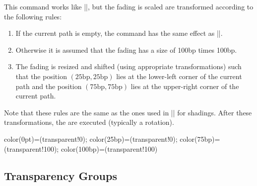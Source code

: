 \begin{command}{\pgfsetfadingforcurrentpath{}}
  This command works like |\pgfsetfading|, but the fading is scaled
  are transformed according to the following rules:
  \begin{enumerate}
  \item
    If the current path is empty, the command has the same effect as
    |\pgfsetfading|.
  \item
    Otherwise it is assumed that the fading has a size of 100bp times
    100bp.
  \item
    The fading is resized and shifted (using appropriate
    transformations) such that the position
    $(25\mathrm{bp},25\mathrm{bp})$ lies at the lower-left corner of
    the current path and the position $(75\mathrm{bp},75\mathrm{bp})$
    lies at the upper-right corner of the current path.
  \end{enumerate}
  Note that these rules are the same as the ones used in
  |\pgfshadepath| for shadings. After these transformations, the
   are executed (typically a rotation).
\begin{codeexample}[]
{ color(0pt)=(transparent!0);    color(25bp)=(transparent!0);
  color(75bp)=(transparent!100); color(100bp)=(transparent!100)}


\end{codeexample}

\end{command}

\subsection{Transparency Groups}

